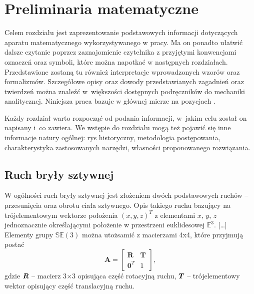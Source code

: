 \chapter{Preliminaria matematyczne}\label{ch_02}
Celem rozdziału jest zaprezentowanie podstawowych informacji dotyczących aparatu matematycznego wykorzystywanego w pracy. Ma on ponadto ułatwić dalsze czytanie poprzez zaznajomienie czytelnika z przyjętymi konwencjami oznaczeń oraz symboli, które można napotkać w następnych rozdziałach. Przedstawione zostaną tu również interpretacje wprowadzonych wzorów oraz formalizmów. Szczegółowe opisy oraz dowody przedstawianych zagadnień oraz twierdzeń można znaleźć w~większości dostępnych podręczników do mechaniki analitycznej. Niniejsza praca bazuje w głównej mierze na pozycjach \cite{TchMu18, RubKro12, Arn81,LegMakeSens}. 

{\red
  Każdy rozdział warto rozpocząć od podania informacji, w~jakim celu został on napisany i~co zawiera. We wstępie do rozdziału mogą też pojawić się inne informacje natury ogólnej: rys historyczny, metodologia postępowania, charakterystyka zastosowanych narzędzi, własności proponowanego rozwiązania.}

\section{Ruch bryły sztywnej}\label{ch_02:ruch}
W ogólności ruch bryły sztywnej jest złożeniem dwóch podstawowych ruchów -- przesunięcia oraz obrotu ciała sztywnego. Opis takiego ruchu bazujący na trójelementowym wektorze położenia $(x,y,z)^T$ z elementami $x$, $y$, $z$ jednoznacznie określającymi położenie w przestrzeni euklidesowej $\mathbb{E}^3$. [\ldots] Elementy grupy $\mathbb{SE}(3)$ można utożsamić z macierzami 4x4, które przyjmują postać
\begin{equation} \label{equ:transf}
  \boldsymbol{A} = \begin{bmatrix}
    \boldsymbol{R} & \boldsymbol{T} \\
    \boldsymbol{0}^T & 1 
  \end{bmatrix},
\end{equation}
gdzie $\boldsymbol{R}$ -- macierz 3$\times$3 opisująca część rotacyjną ruchu, $\boldsymbol{T}$ -- trójelementowy wektor opisujący część translacyjną ruchu.  

